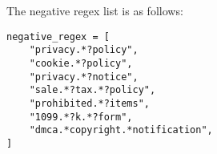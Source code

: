The negative regex list is as follows:
\begin{lstlisting}[label=Negative]
negative_regex = [
    "privacy.*?policy",
    "cookie.*?policy",
    "privacy.*?notice",
    "sale.*?tax.*?policy",
    "prohibited.*?items",
    "1099.*?k.*?form",
    "dmca.*copyright.*notification",
]

\end{lstlisting}





